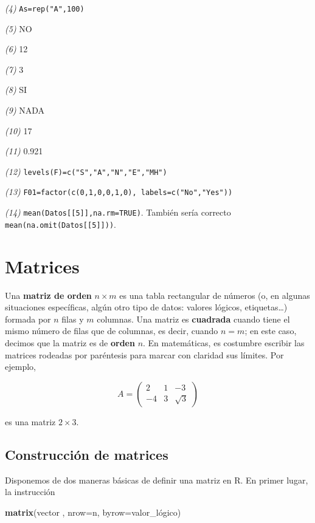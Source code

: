 \documentclass[
]{book}
\newenvironment{Shaded}{\begin{snugshade}}{\end{snugshade}}
\newcommand{\DataTypeTok}[1]{\textcolor[rgb]{0.13,0.29,0.53}{#1}}
\newcommand{\KeywordTok}[1]{\textcolor[rgb]{0.13,0.29,0.53}{\textbf{#1}}}
\newcommand{\NormalTok}[1]{#1}
\theoremstyle{definition}
\theoremstyle{definition}
\theoremstyle{definition}
\theoremstyle{remark}
\begin{document}
\emph{(4)} \texttt{As=rep("A",100)}

\emph{(5)} NO

\emph{(6)} 12

\emph{(7)} 3

\emph{(8)} SI

\emph{(9)} NADA

\emph{(10)} 17

\emph{(11)} 0.921

\emph{(12)} \verb+levels(F)=c("S","A","N","E","MH")+

\emph{(13)} \texttt{F01=factor(c(0,1,0,0,1,0),\ labels=c("No","Yes"))}

\emph{(14)} \texttt{mean(Datos{[}{[}5{]}{]},na.rm=TRUE)}. También sería correcto \texttt{mean(na.omit(Datos{[}{[}5{]}{]}))}.

\hypertarget{chap:matrix}{%
\chapter{Matrices}\label{chap:matrix}}

Una \textbf{matriz de orden} \(n\times m\) es una tabla
rectangular de números (o, en algunas situaciones específicas, algún otro tipo de datos: valores lógicos, etiquetas\ldots) formada por \(n\) filas y \(m\) columnas. Una matriz es \textbf{cuadrada} cuando tiene el mismo número de filas que de columnas, es decir, cuando \(n=m\); en este caso, decimos que la matriz es de \textbf{orden} \(n\). En matemáticas, es costumbre escribir las matrices rodeadas por paréntesis para marcar con claridad sus límites. Por ejemplo,

\[
A = \left(\begin{matrix}
2 & 1 & -3\\ -4 & 3 & \sqrt{3}\end{matrix}
\right)
\]

es una matriz \(2\times 3\).

\hypertarget{construcciuxf3n-de-matrices}{%
\section{Construcción de matrices}\label{construcciuxf3n-de-matrices}}

Disponemos de dos maneras básicas de definir una matriz en R. En primer lugar, la instrucción

\begin{Shaded}
\begin{Highlighting}[]
\KeywordTok{matrix}\NormalTok{(vector , }\DataTypeTok{nrow=}\NormalTok{n, }\DataTypeTok{byrow=}\NormalTok{valor\_lógico)}
\end{Highlighting}
\end{Shaded}
\end{document}
